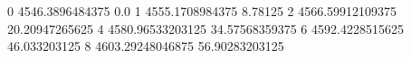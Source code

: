0 4546.3896484375 0.0
1 4555.1708984375 8.78125
2 4566.59912109375 20.20947265625
4 4580.96533203125 34.57568359375
6 4592.4228515625 46.033203125
8 4603.29248046875 56.90283203125
